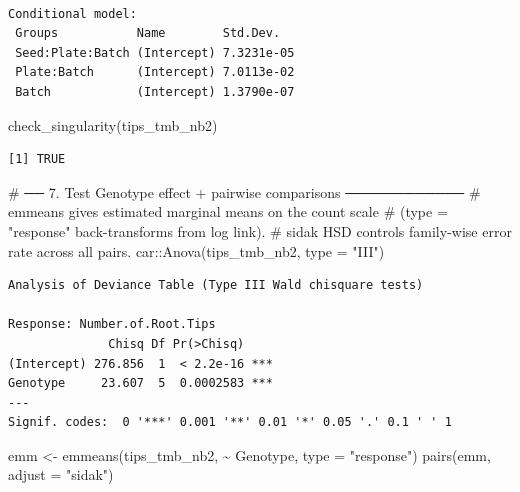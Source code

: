 \documentclass[
  letterpaper,
  DIV=11,
  numbers=noendperiod]{scrartcl}
\newenvironment{Shaded}{\begin{snugshade}}{\end{snugshade}}
\newcommand{\AttributeTok}[1]{\textcolor[rgb]{0.40,0.45,0.13}{#1}}
\newcommand{\CommentTok}[1]{\textcolor[rgb]{0.37,0.37,0.37}{#1}}
\newcommand{\FunctionTok}[1]{\textcolor[rgb]{0.28,0.35,0.67}{#1}}
\newcommand{\NormalTok}[1]{\textcolor[rgb]{0.00,0.23,0.31}{#1}}
\newcommand{\OtherTok}[1]{\textcolor[rgb]{0.00,0.23,0.31}{#1}}
\newcommand{\SpecialCharTok}[1]{\textcolor[rgb]{0.37,0.37,0.37}{#1}}
\newcommand{\StringTok}[1]{\textcolor[rgb]{0.13,0.47,0.30}{#1}}
\begin{document}
\begin{verbatim}

Conditional model:
 Groups           Name        Std.Dev.  
 Seed:Plate:Batch (Intercept) 7.3231e-05
 Plate:Batch      (Intercept) 7.0113e-02
 Batch            (Intercept) 1.3790e-07
\end{verbatim}

\begin{Shaded}
\begin{Highlighting}[]
\FunctionTok{check\_singularity}\NormalTok{(tips\_tmb\_nb2) }
\end{Highlighting}
\end{Shaded}

\begin{verbatim}
[1] TRUE
\end{verbatim}

\begin{Shaded}
\begin{Highlighting}[]
\CommentTok{\# ── 7. Test Genotype effect + pairwise comparisons ────────────}
\CommentTok{\# emmeans gives estimated marginal means on the count scale}
\CommentTok{\# (type = "response" back{-}transforms from log link).}
\CommentTok{\# sidak HSD controls family{-}wise error rate across all pairs.}
\NormalTok{car}\SpecialCharTok{::}\FunctionTok{Anova}\NormalTok{(tips\_tmb\_nb2, }\AttributeTok{type =} \StringTok{"III"}\NormalTok{)}
\end{Highlighting}
\end{Shaded}

\begin{verbatim}
Analysis of Deviance Table (Type III Wald chisquare tests)

Response: Number.of.Root.Tips
              Chisq Df Pr(>Chisq)    
(Intercept) 276.856  1  < 2.2e-16 ***
Genotype     23.607  5  0.0002583 ***
---
Signif. codes:  0 '***' 0.001 '**' 0.01 '*' 0.05 '.' 0.1 ' ' 1
\end{verbatim}

\begin{Shaded}
\begin{Highlighting}[]
\NormalTok{emm }\OtherTok{\textless{}{-}} \FunctionTok{emmeans}\NormalTok{(tips\_tmb\_nb2, }\SpecialCharTok{\textasciitilde{}}\NormalTok{ Genotype, }\AttributeTok{type =} \StringTok{"response"}\NormalTok{)}
\FunctionTok{pairs}\NormalTok{(emm, }\AttributeTok{adjust =} \StringTok{"sidak"}\NormalTok{)}
\end{Highlighting}
\end{Shaded}
\end{document}
